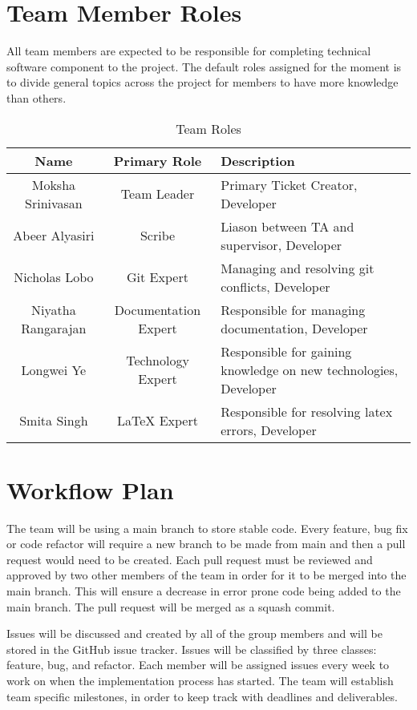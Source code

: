 \documentclass{article}
\begin{document}
\section{Team Member Roles} 
All team members are expected to be responsible for completing technical software component to the project. The default roles assigned for the moment is to divide general topics across the project for members to have more knowledge than others. 
\begin{table}[H]
    \centering
    \begin{tabular}{|c|c|p{60mm}|}
         \hline
         Name & Primary Role & Description\\
         \hline
         Moksha Srinivasan & Team Leader & Primary Ticket Creator, Developer\\
         \hline
         Abeer Alyasiri & Scribe & Liason between TA and supervisor, Developer\\
         \hline
         Nicholas Lobo & Git Expert & Managing and resolving git conflicts, Developer \\
         \hline
         Niyatha Rangarajan & Documentation Expert & Responsible for managing documentation, Developer \\
         \hline
         Longwei Ye & Technology Expert & Responsible for gaining knowledge on new technologies, Developer  \\
         \hline
         Smita Singh & LaTeX Expert & Responsible for resolving latex errors, Developer \\
         \hline
    \end{tabular}
    \caption{Team Roles}
    \label{tab:team_roles}
\end{table}

\section{Workflow Plan} %

The team will be using a main branch to store stable code. Every feature, bug fix or code refactor will require a new branch to be made from main and then a pull request would need to be created. Each pull request must be reviewed and approved by two other members of the team in order for it to be merged into the main branch. This will ensure a decrease in error prone code being added to the main branch. The pull request will be merged as a squash commit.

Issues will be discussed and created by all of the group members and will be stored in the GitHub issue tracker. Issues will be classified by three classes: feature, bug, and refactor. Each member will be assigned issues every week to work on when the implementation process has started. The team will establish team specific milestones, in order to keep track with deadlines and deliverables. 
\end{document}
